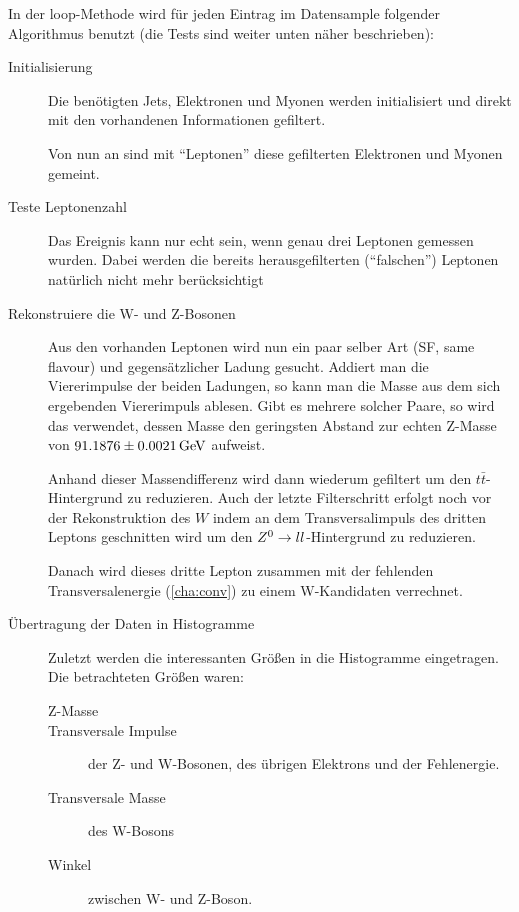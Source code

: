 In der loop-Methode wird für jeden Eintrag im Datensample folgender Algorithmus
benutzt (die Tests sind weiter unten näher beschrieben):
\begin{description}
  \item[Initialisierung] Die benötigten Jets, Elektronen und Myonen werden
    initialisiert und direkt mit den vorhandenen Informationen gefiltert.

    Von nun an sind mit "`Leptonen"' diese gefilterten Elektronen und Myonen
    gemeint.

  \item[Teste Leptonenzahl] Das Ereignis kann nur echt sein, wenn genau drei
    Leptonen gemessen wurden. Dabei werden die bereits herausgefilterten
    ("`falschen"') Leptonen natürlich nicht mehr berücksichtigt
    
  \item[Rekonstruiere die W- und Z-Bosonen] Aus den vorhanden Leptonen wird nun
    ein paar selber Art (SF, same flavour) und gegensätzlicher Ladung gesucht.
    Addiert man die Viererimpulse der beiden Ladungen, so kann man die Masse aus
    dem sich ergebenden Viererimpuls ablesen. Gibt es mehrere solcher Paare, so
    wird das verwendet, dessen Masse den geringsten Abstand zur echten Z-Masse
    von $\unit[91.1876 \pm 0.0021]{GeV}$\cite{pdg-booklet} aufweist.

    Anhand dieser Massendifferenz wird dann wiederum gefiltert um den
    $t\bar{t}$-Hintergrund zu reduzieren. Auch der letzte Filterschritt erfolgt
    noch vor der Rekonstruktion des $W$ indem an dem Transversalimpuls des
    dritten Leptons geschnitten wird um den $Z^0\to ll$-Hintergrund zu
    reduzieren.

    Danach wird dieses dritte Lepton zusammen mit der fehlenden
    Transversalenergie (\ref{cha:conv}) zu einem W-Kandidaten verrechnet.

  \item[Übertragung der Daten in Histogramme] Zuletzt werden die interessanten
    Größen in die Histogramme eingetragen. Die betrachteten Größen waren:
    \begin{description}
      \item[Z-Masse]
      \item[Transversale Impulse] der Z- und W-Bosonen, des übrigen Elektrons
        und der Fehlenergie.
      \item[Transversale Masse] des W-Bosons
      \item[Winkel] zwischen W- und Z-Boson.
    \end{description}
\end{description}

